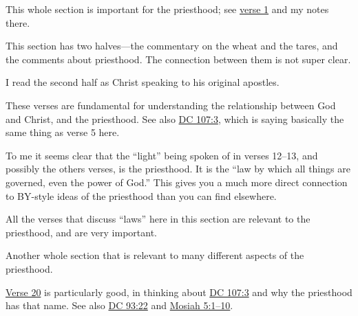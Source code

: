 \begin{compactdesc}
			\item[{\hyperref[DC85-11]{DC 85:11}}]
			\item[{\hyperref[DC86]{DC 86}}] \phantom{.}
				\begin{compactitem}
					\item This whole section is important for the priesthood; see \hyperref[DC86-1]{verse 1} and my notes there.
					\item This section has two halves---the commentary on the wheat and the tares, and the comments about priesthood. The connection between them is not super clear.
					\item I read the second half as Christ speaking to his original apostles.
				\end{compactitem}
			\item[{\hyperref[DC88-5]{DC 88:5--13}}] \phantom{.}
				\begin{compactitem}
					\item These verses are fundamental for understanding the relationship between God and Christ, and the priesthood. See also \hyperref[DC107-3]{DC 107:3}, which is saying basically the same thing as verse 5 here.
					\item To me it seems clear that the ``light'' being spoken of in verses 12--13, and possibly the others verses, is the priesthood. It is the ``law by which all things are governed, even the power of God.'' This gives you a much more direct connection to BY-style ideas of the priesthood than you can find elsewhere.
				\end{compactitem} 
			\item[{\hyperref[DC88-14]{DC 88:14--60?}}] \phantom{.} 
				\begin{compactitem}
					\item All the verses that discuss ``laws'' here in this section are relevant to the priesthood, and are very important.
				\end{compactitem}
			\item[{\hyperref[DC93]{DC 93}}] \phantom{.} 
				\begin{compactitem}
					\item Another whole section that is relevant to many different aspects of the priesthood.
					\item \hyperref[DC93-20]{Verse 20} is particularly good, in thinking about \hyperref[DC107-3]{DC 107:3} and why the priesthood has that name. See also \hyperref[DC93-22]{DC 93:22} and \hyperref[MOSIAH-5-1]{Mosiah 5:1--10}.
				\end{compactitem}

\end{compactdesc}
